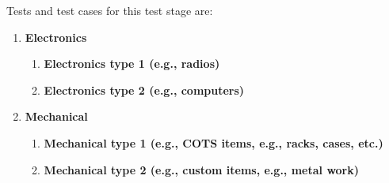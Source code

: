 
Tests and test cases for this test stage are:
\begin{enumerate}[itemindent=5pt,topsep=0pt,itemsep=0pt,partopsep=0pt, parsep=0pt]
	\item {\bf Electronics}
	\begin{enumerate}[itemindent=5pt,topsep=0pt,itemsep=0pt,partopsep=0pt, parsep=0pt]
		\item {\bf Electronics type 1 (e.g., radios)}
		\item {\bf Electronics type 2 (e.g., computers)}
  \end{enumerate}

	\item {\bf Mechanical}
	\begin{enumerate}[itemindent=5pt,topsep=0pt,itemsep=0pt,partopsep=0pt, parsep=0pt]
		\item {\bf Mechanical type 1 (e.g., COTS items, e.g., racks, cases, etc.)}
		\item {\bf Mechanical type 2 (e.g., custom items, e.g., metal work)}
  \end{enumerate}
\end{enumerate}

